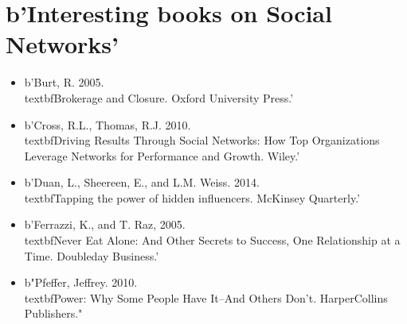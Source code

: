 \documentclass[a4paper,12pt]{article}
\begin{document}
\newpage


\section*{b'Interesting books on Social Networks'}


\begin{itemize}
\item[] b'Burt, R. 2005. \\textbf{Brokerage and Closure}. Oxford University Press.'
\item[] b'Cross, R.L., Thomas, R.J. 2010. \\textbf{Driving Results Through Social Networks: How Top Organizations Leverage Networks for Performance and Growth}. Wiley.'
\item[] b'Duan, L., Sheereen, E., and L.M. Weiss. 2014. \\textbf{Tapping the power of hidden influencers}. McKinsey Quarterly.'
\item[] b'Ferrazzi, K., and T. Raz, 2005. \\textbf{Never Eat Alone: And Other Secrets to Success, One Relationship at a Time}. Doubleday Business.'
\item[] b"Pfeffer, Jeffrey. 2010. \\textbf{Power: Why Some People Have It--And Others Don't}. HarperCollins Publishers."
\end{itemize}
\end{document}
